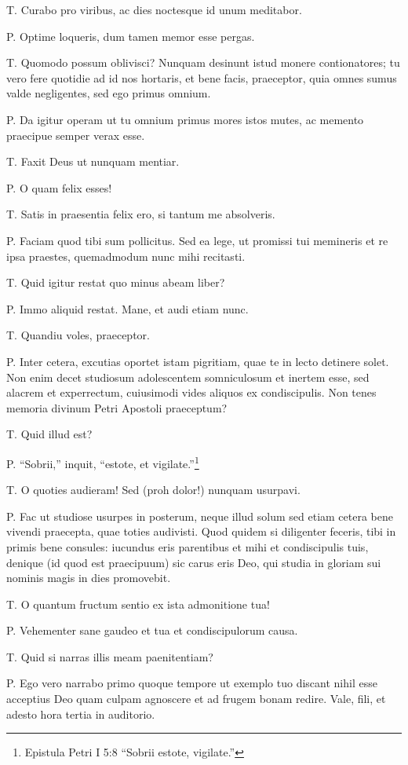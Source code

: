 \documentclass{article}
\begin{document}
T. Curabo pro viribus, ac dies noctesque id unum meditabor.

P. Optime loqueris, dum tamen memor esse pergas.

T. Quomodo possum oblivisci? Nunquam desinunt istud monere contionatores; tu vero fere quotidie ad id nos hortaris, et bene facis, praeceptor, quia omnes sumus valde negligentes, sed ego primus omnium.

P. Da igitur operam ut tu omnium primus mores istos mutes, ac memento praecipue semper verax esse.

T. Faxit Deus ut nunquam mentiar.

P. O quam felix esses!

T. Satis in praesentia felix ero, si tantum me absolveris.

P. Faciam quod tibi sum pollicitus. Sed ea lege, ut promissi tui memineris et re ipsa praestes, quemadmodum nunc mihi recitasti.

T. Quid igitur restat quo minus abeam liber?

P. Immo aliquid restat. Mane, et audi etiam nunc.

T. Quandiu voles, praeceptor.

P. Inter cetera, excutias oportet istam pigritiam, quae te in lecto detinere solet. Non enim decet studiosum adolescentem somniculosum et inertem esse, sed alacrem et experrectum, cuiusimodi vides aliquos ex condiscipulis. Non tenes memoria divinum Petri Apostoli praeceptum?

T. Quid illud est?

P. ``Sobrii,'' inquit, ``estote, et vigilate.''\footnote{Epistula Petri I 5:8 ``Sobrii estote, vigilate.''}

T. O quoties audieram! Sed (proh dolor!) nunquam usurpavi.

P. Fac ut studiose usurpes in posterum, neque illud solum sed etiam cetera bene vivendi praecepta, quae toties audivisti. Quod quidem si diligenter feceris, tibi in primis bene consules: iucundus eris parentibus et mihi et condiscipulis tuis, denique (id quod est praecipuum) sic carus eris Deo, qui studia in gloriam sui nominis magis in dies promovebit.

T. O quantum fructum sentio ex ista admonitione tua!

P. Vehementer sane gaudeo et tua et condiscipulorum causa.

T. Quid si narras illis meam paenitentiam?

P. Ego vero narrabo primo quoque tempore ut exemplo tuo discant nihil esse acceptius Deo quam culpam agnoscere et ad frugem bonam redire. Vale, fili, et adesto hora tertia in auditorio.
\end{document}
